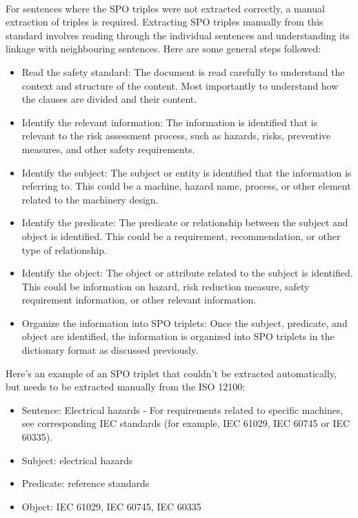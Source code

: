 \paragraph{} For sentences where the SPO triples were not extracted correctly, a manual extraction of triples is required. Extracting SPO triples manually from this standard involves reading through the individual sentences and understanding its linkage with neighbouring sentences. Here are some general steps followed:
\begin{itemize}
    \item Read the safety standard: The document is read carefully to understand the context and structure of the content. Most importantly to understand how the clauses are divided and their content.
    \item Identify the relevant information: The information is identified that is relevant to the risk assessment process, such as hazards, risks, preventive measures, and other safety requirements.
    \item Identify the subject: The subject or entity is identified that the information is referring to. This could be a machine, hazard name, process, or other element related to the machinery design.
    \item Identify the predicate: The predicate or relationship between the subject and object is identified. This could be a requirement, recommendation, or other type of relationship.
    \item Identify the object: The object or attribute related to the subject is identified. This could be information on hazard, risk reduction measure, safety requirement information, or other relevant information.
    \item Organize the information into SPO triplets: Once the subject, predicate, and object are identified, the information is organized into SPO triplets in the dictionary format as discussed previously.
\end{itemize}

Here's an example of an SPO triplet that couldn't be extracted automatically, but needs to be extracted manually from the ISO 12100:
\begin{itemize}
    \item Sentence: Electrical hazards - For requirements related to specific machines, see corresponding IEC standards (for example, IEC 61029, IEC 60745 or IEC 60335).
    \item Subject: electrical hazards
    \item Predicate: reference standards
    \item Object: IEC 61029, IEC 60745, IEC 60335
\end{itemize}
    
